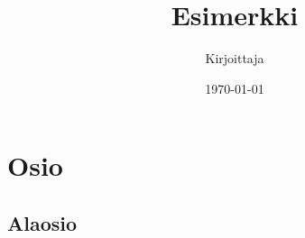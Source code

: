 \documentclass{article}
\begin{document}
\title{Esimerkki}
\author{Kirjoittaja}
\date{\today}
\maketitle

\tableofcontents

\begin{abstract}
\blindtext
\end{abstract}

\section{Osio}

\subsection{Alaosio}

\Blindtext
\end{document}
